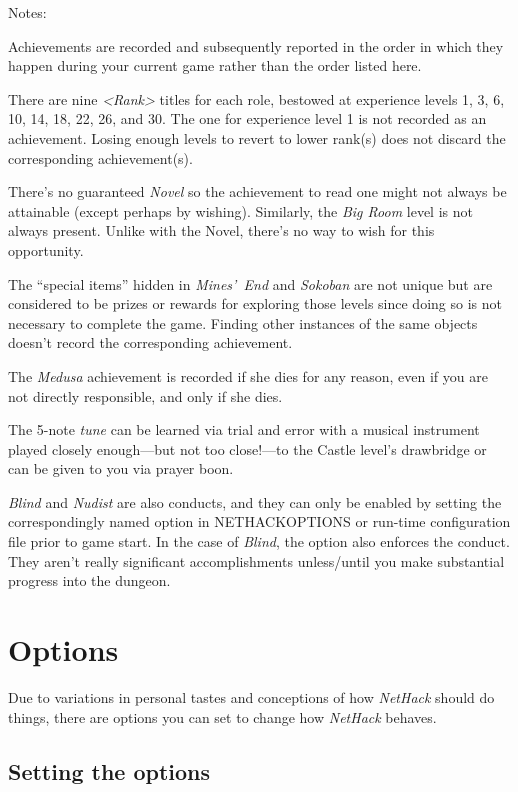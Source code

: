 \noindent
Notes:

Achievements are recorded and subsequently reported in the order in which
they happen during your current game rather than the order listed here.

There are nine {\it <Rank>\/} titles for each role, bestowed at experience
levels 1, 3, 6, 10, 14, 18, 22, 26, and 30.
The one for experience level 1 is not recorded as an achievement.
Losing enough levels to revert to lower rank(s) does not discard the
corresponding achievement(s).

There's no guaranteed {\it Novel} so the achievement to read one might
not always be attainable (except perhaps by wishing).
Similarly, the {\it Big Room} level is not always present.
Unlike with the Novel, there's no way to wish for this opportunity.

The ``special items'' hidden in {\it Mines'~End\/} and {\it Sokoban\/}
are not unique but are considered to be prizes or rewards
for exploring those levels since doing so is not necessary to complete
the game.
Finding other instances of the same objects doesn't record the
corresponding achievement.

The {\it Medusa\/} achievement is recorded if she dies for any reason,
even if you are not directly responsible, and only if she dies.

The 5-note {\it tune\/} can be learned via trial and error with a musical
instrument played closely
enough---but not too close!---to
the Castle level's drawbridge or can be given to you via prayer boon.

{\it Blind\/} and {\it Nudist\/} are also conducts, and they can only be
enabled by setting the correspondingly named option in NETHACKOPTIONS
or run-time configuration file prior to game start.
In the case of {\it Blind\/}, the option also enforces the conduct.
They aren't really significant accomplishments unless/until you make
substantial progress into the dungeon.

\section{Options}

Due to variations in personal tastes and conceptions of how {\it NetHack\/}
should do things, there are options you can set to change how {\it NetHack\/}
behaves.

\subsection*{Setting the options}

